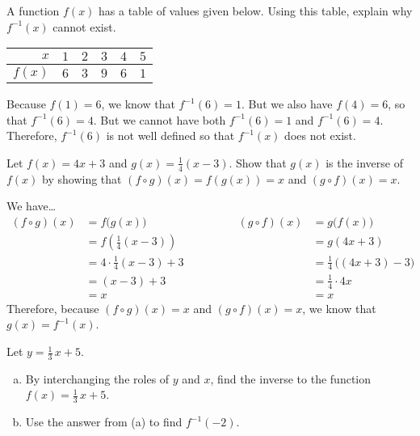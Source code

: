 \documentclass[11pt,letterpaper]{article}
\begin{document}

 A function $f(x)$ has a table of values given below. Using this table, explain why $f^{-1}(x)$ cannot exist. \par
	\begin{table}[!ht]
	\centering
	\begin{tabular}{|r||c|c|c|c|c|} \hline
	$x$ & $1$ & $2$ & $3$ & $4$ & $5$ \\ \hline
	$f(x)$ & $6$ & $3$ & $9$ & $6$ & $1$ \\ \hline
	\end{tabular}
	\end{table} \pspace

\sol Because $f(1)= 6$, we know that $f^{-1}(6)= 1$. But we also have $f(4)= 6$, so that $f^{-1}(6)= 4$. But we cannot have both $f^{-1}(6)= 1$ and $f^{-1}(6)= 4$. Therefore, $f^{-1}(6)$ is not well defined so that $f^{-1}(x)$ does not exist. 



\newpage



 Let $f(x)= 4x + 3$ and $g(x)= \frac{1}{4}(x - 3)$. Show that $g(x)$ is the inverse of $f(x)$ by showing that $(f \circ g)(x)= f(g(x))= x$ and $(g \circ f)(x)= x$. \pspace

\sol We have\dots
	\[
	\begin{aligned}
	(f \circ g)(x)&= f \big( g(x) \big) &\hspace{1cm}&& (g \circ f)(x)&= g \big( f(x) \big) \\[0.3cm]
	&= f \left( \frac{1}{4} (x - 3) \right) &&& &= g(4x + 3) \\[0.3cm]
	&= 4 \cdot \frac{1}{4} (x - 3) + 3 &&& &= \frac{1}{4} \, \big( (4x + 3) - 3 \big) \\[0.3cm]
	&= (x - 3) + 3 &&& &= \frac{1}{4} \cdot 4x \\[0.3cm]
	&= x &&& &=x
	\end{aligned}
	\] \pspace
Therefore, because $(f \circ g)(x)= x$ and $(g \circ f)(x)= x$, we know that $g(x)= f^{-1}(x)$. 



\newpage



 Let $y= \frac{1}{3}\,x + 5$.
	\begin{enumerate}[(a)]
	\item By interchanging the roles of $y$ and $x$, find the inverse to the function $f(x)= \frac{1}{3}\,x + 5$.
	\item Use the answer from (a) to find $f^{-1}(-2)$. 
	\end{enumerate} \pspace
\end{document}
